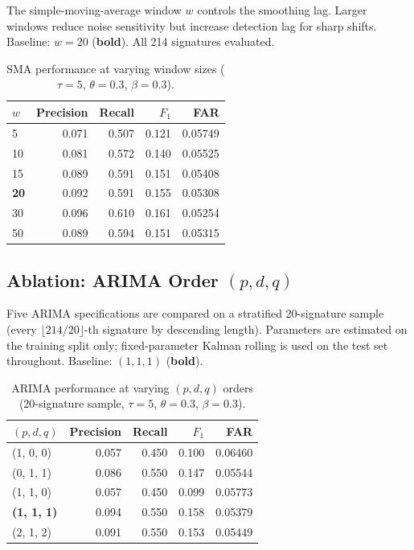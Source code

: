 \documentclass[11pt,a4paper]{article}
\begin{document}
The simple-moving-average window $w$ controls the smoothing lag.  Larger
windows reduce noise sensitivity but increase detection lag for sharp shifts.
Baseline: $w = 20$ (\textbf{bold}).
All 214 signatures evaluated.

\begin{table}[H]
\centering
\caption{SMA performance at varying window sizes ($\tau=5$, $\theta=0.3$, $\beta=0.3$).}
\label{tab:abl_sma_win}
\begin{tabular}{lrrrr}
\toprule
$w$ & Precision & Recall & $F_1$ & FAR \\
\midrule
  5 & 0.071 & 0.507 & 0.121 & 0.05749 \\
  10 & 0.081 & 0.572 & 0.140 & 0.05525 \\
  15 & 0.089 & 0.591 & 0.151 & 0.05408 \\
  \textbf{20} & 0.092 & 0.591 & 0.155 & 0.05308 \\
  30 & 0.096 & 0.610 & 0.161 & 0.05254 \\
  50 & 0.089 & 0.594 & 0.151 & 0.05315 \\
\bottomrule
\end{tabular}
\end{table}


\subsection{Ablation: ARIMA Order $(p,d,q)$}

Five ARIMA specifications are compared on a stratified 20-signature
sample (every $\lfloor 214/20 \rfloor$-th signature by descending
length).  Parameters are estimated on the training split only; fixed-parameter
Kalman rolling is used on the test set throughout.
Baseline: $(1,1,1)$ (\textbf{bold}).

\begin{table}[H]
\centering
\caption{ARIMA performance at varying $(p,d,q)$ orders (20-signature sample,
  $\tau=5$, $\theta=0.3$, $\beta=0.3$).}
\label{tab:abl_arima_ord}
\begin{tabular}{lrrrr}
\toprule
$(p,d,q)$ & Precision & Recall & $F_1$ & FAR \\
\midrule
  (1, 0, 0) & 0.057 & 0.450 & 0.100 & 0.06460 \\
  (0, 1, 1) & 0.086 & 0.550 & 0.147 & 0.05544 \\
  (1, 1, 0) & 0.057 & 0.450 & 0.099 & 0.05773 \\
  \textbf{(1, 1, 1)} & 0.094 & 0.550 & 0.158 & 0.05379 \\
  (2, 1, 2) & 0.091 & 0.550 & 0.153 & 0.05449 \\
\bottomrule
\end{tabular}
\end{table}
\end{document}
